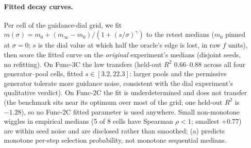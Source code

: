 \documentclass[%
 aip,
 amsmath,amssymb,
 floatfix,
 reprint,%
]{revtex4-1}
\begin{document}
\paragraph{Fitted decay curves.}
Per cell of the guidance-dial grid, we fit
$m(\sigma) = m_0 + (m_\infty - m_0)/(1 + (s/\sigma)^{\gamma})$ to the
retest medians ($m_0$ pinned at $\sigma{=}0$; $s$ is the dial value at
which half the oracle's edge is lost, in raw $f$ units), then score the
fitted curve on the \emph{original} experiment's medians (disjoint
seeds, no refitting). On Func-3C the law transfers (held-out
$R^2$ 0.66--0.88 across all four generator--pool cells, fitted
$s \in [3.2, 22.3]$: larger pools and the permissive generator tolerate
more guidance noise, consistent with the dial experiment's qualitative
verdict). On Func-2C the fit is underdetermined and does not transfer
(the benchmark sits near its optimum over most of the grid; one
held-out $R^2$ is $-1.28$), so no Func-2C fitted parameter is used
anywhere. Small non-monotone wiggles in empirical medians (5 of 8 cells
have Spearman $\rho < 1$; smallest $+0.77$) are within seed noise and
are disclosed rather than smoothed; (a) predicts monotone per-step
selection probability, not monotone sequential medians.

\end{document}

